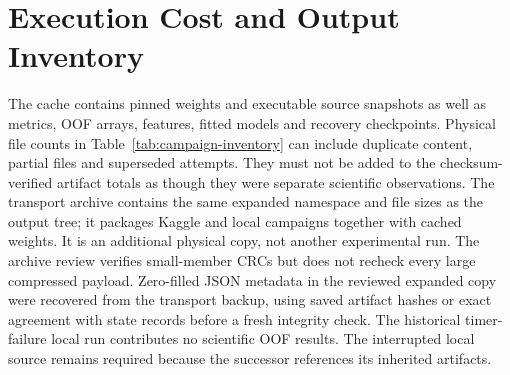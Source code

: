 \begin{table}[htbp]
  \centering
  \caption[Positive Precision@10 by WT-PSI stratum, in percent]{Positive Precision@10 by WT-PSI stratum, in percent. Peptides without positive hits
  remain in precision; zero-event strata do not supply recall or enrichment evidence.}
  \label{tab:priority-strata}
  
\end{table}

\FloatBarrier
\section{Execution Cost and Output Inventory}
\begin{table}[htbp]
  \centering
  \caption[Recorded durations of completed local job attempts, counting inherited work once]{Recorded durations of completed local job attempts, counting inherited work once.
  Earlier attempts of paused/resumed jobs may be absent; these are not GPU-active or full elapsed times.}
  \label{tab:campaign-timing}
  
\end{table}
The cache contains pinned weights and executable source snapshots as well as metrics, OOF arrays,
features, fitted models and recovery checkpoints. Physical file counts in Table~\ref{tab:campaign-inventory}
can include duplicate content, partial files and superseded attempts. They must not be added to
the checksum-verified artifact totals as though they were separate scientific observations.
The transport archive contains the same expanded namespace and file sizes as the output tree;
it packages Kaggle and local campaigns together with cached weights. It is an additional physical
copy, not another experimental run. The archive review verifies small-member CRCs but does not
recheck every large compressed payload.
Zero-filled JSON metadata in the reviewed expanded copy were recovered from the transport backup,
using saved artifact hashes or exact agreement with state records before a fresh integrity check.
The historical timer-failure local run contributes no scientific OOF results. The interrupted local
source remains required because the successor references its inherited artifacts.

\begin{table}[htbp]
  \centering
  \caption[Physical output inventory at review time]{Physical output inventory at review time. Weight caches and code snapshots are supporting
  assets, not evaluation datasets.}
  \label{tab:campaign-inventory}
  
\end{table}
